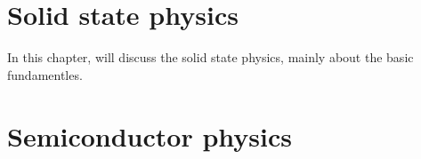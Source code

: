 \chapter{Solid state physics}
\label{Solid state physics}
In this chapter, will discuss the solid state physics, mainly about the basic fundamentles.


\chapter{Semiconductor physics}
\label{Semiconductor physics}